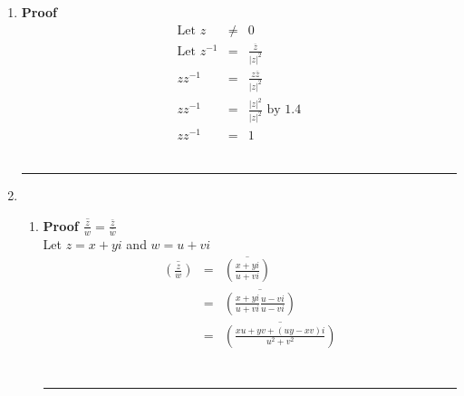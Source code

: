 \documentclass{article}%
\newcommand\abs[1]{\left|#1\right|}
\newenvironment{proof}[1][]{\textbf{Proof #1} }{\ \rule{0.5em}{0.5em}}
\begin{document}
\begin{enumerate}
\begin{enumerate}[label*=\arabic*.]
\begin{enumerate}[label=\alph*]
\begin{proof}[$\abs{zw}=\abs{z}\abs{w}$]
            \end{proof}
            \item
            \begin{proof}[$\abs{z}=\abs{\overline{z}}$]
                \\ Let $z=x+yi$
                \begin{eqnarray*}
                    \abs{z}&=&\abs{x+yi} \\
                           &=&\sqrt{x^2+y^2} \\
                    \abs{\overline{z}}&=&\abs{\overline{x+yi}} \\
                                      &=&\abs{x-iy} \\
                                      &=&\sqrt{x^2+y^2} \\
                    \abs{z}&=&\abs{\overline{z}} 
                \end{eqnarray*}
            \end{proof}
        \end{enumerate}
        \item 
        \begin{proof}
            \begin{eqnarray*}
                \text{Let } z&\neq&0 \\
                \text{Let } z^{-1}&=&\frac{\overline{z}}{\abs{z}^2} \\
                z z^{-1}&=&\frac{z\overline{z}}{\abs{z}^2} \\
                z z^{-1}&=&\frac{\abs{z}^2}{\abs{z}^2} \text{ by 1.4} \\
                z z^{-1}&=&1
            \end{eqnarray*}
        \end{proof}
        \item
        \begin{enumerate}[label=\alph*]
            \item
            \begin{proof}[$\overline{\frac{z}{w}}=\frac{\bar{z}}{\bar{w}}$]
                \\ Let $z=x+yi$ and $w=u+vi$
                \begin{eqnarray*}
                    \overline{(\frac{z}{w})}&=&\overline{(\frac{x+yi}{u+vi})} \\
                                            &=&\overline{(\frac{x+yi}{u+vi}\frac{u-vi}{u-vi})} \\
                                            &=&\overline{(\frac{xu+yv+(uy-xv)i}{u^2+v^2})} \\

\end{eqnarray*}
\end{proof}
\end{enumerate}
\end{enumerate}
\end{enumerate}
\end{document}
